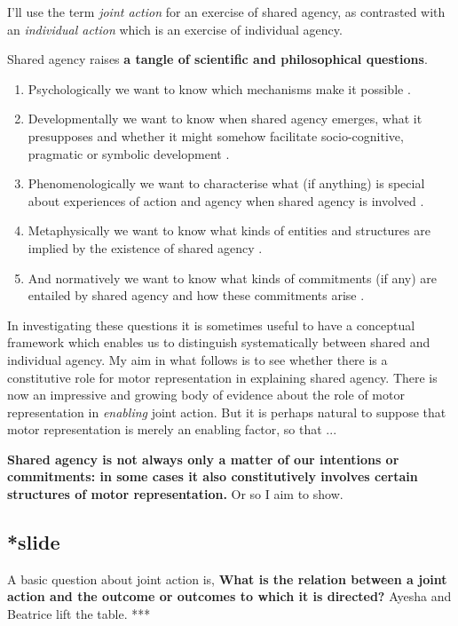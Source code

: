 \documentclass[12pt,\papersize]{extarticle}
\begin{document}
I'll use the term \emph{joint action} for an exercise of shared agency, as contrasted with an \emph{individual action} which is an exercise of individual agency.


Shared agency raises \textbf{a tangle of scientific and philosophical questions}.  
%
\begin{enumerate}
\item Psychologically we want to know which mechanisms make it possible \citep{Sebanz:2006yq,vesper_minimal_2010}.  
\item Developmentally we want to know when shared agency emerges, what it presupposes and whether it might somehow facilitate socio-cognitive, pragmatic or symbolic development \citep{Moll:2007gu,Hughes:2004zj,Brownell:2006gu}.  
\item Phenomenologically we want to characterise what (if anything) is special about experiences of action and agency when shared agency is involved \citep{Pacherie:2010fk}.  
\item Metaphysically we want to know what kinds of entities and structures are implied by the existence of shared agency \citep{Gilbert:1992rs,Searle:1994lb}.  
\item And normatively we want to know what kinds of commitments (if any) are entailed by shared agency and how these commitments arise \citep{Roth:2004ki}.
\end{enumerate}
%
In investigating these questions it is sometimes useful to have a conceptual framework which enables us to distinguish systematically between shared and individual agency.
My aim in what follows is to see whether there is a constitutive role for motor representation in explaining shared agency.
There is now an impressive and growing body of evidence about the role of motor representation in \emph{enabling} joint action.
But it is perhaps natural to suppose that motor representation is merely an enabling factor, so that ...

\textbf{Shared agency is not always only a matter of our intentions or commitments: in some cases it also constitutively involves certain structures of motor representation.}
Or so I aim to show.



\subsection{*slide}
A basic question about joint action is,
\textbf{What is the relation between a joint action and the outcome or outcomes to which it is directed?}
Ayesha and Beatrice lift the table. ***
\end{document}
